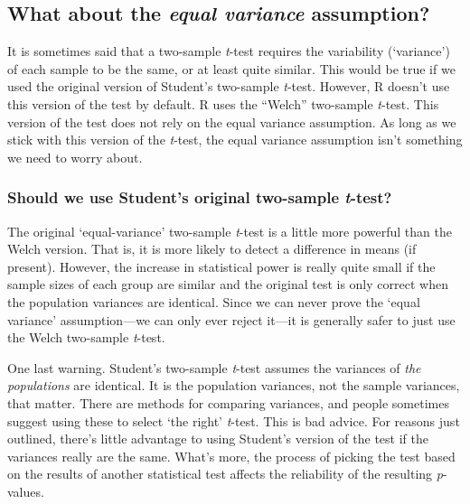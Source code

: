 \documentclass[
]{book}
\newenvironment{greybox}{
  \definecolor{shadecolor}{rgb}{0.95,0.95,0.95}  %
  \color{black}
  \begin{shaded}}
 {\end{shaded}}
\newenvironment{infobox}[1]
  {
  \begin{itemize}
  \renewcommand{\labelitemi}{
    \raisebox{-.7\height}[0pt][0pt]{
      {\setkeys{Gin}{width=3em,keepaspectratio}
        \texttt{[image: images/\#1]}}
    }
  }
  \setlength{\fboxsep}{1em}
  \begin{greybox}
  \item
  }
  {
  \end{greybox}
  \end{itemize}
  }
\begin{document}
\hypertarget{what-about-the-equal-variance-assumption}{%
\subsection{\texorpdfstring{What about the \emph{equal variance} assumption?}{What about the equal variance assumption?}}\label{what-about-the-equal-variance-assumption}}

It is sometimes said that a two-sample \emph{t}-test requires the variability (`variance') of each sample to be the same, or at least quite similar. This would be true if we used the original version of Student's two-sample \emph{t}-test. However, R doesn't use this version of the test by default. R uses the ``Welch'' two-sample \emph{t}-test. This version of the test does not rely on the equal variance assumption. As long as we stick with this version of the \emph{t}-test, the equal variance assumption isn't something we need to worry about.

\begin{infobox}{information}

\hypertarget{should-we-use-students-original-two-sample-t-test}{%
\subsubsection*{\texorpdfstring{Should we use Student's original two-sample \emph{t}-test?}{Should we use Student's original two-sample t-test?}}\label{should-we-use-students-original-two-sample-t-test}}

The original `equal-variance' two-sample \emph{t}-test is a little more powerful than the Welch version. That is, it is more likely to detect a difference in means (if present). However, the increase in statistical power is really quite small if the sample sizes of each group are similar and the original test is only correct when the population variances are identical. Since we can never prove the `equal variance' assumption---we can only ever reject it---it is generally safer to just use the Welch two-sample \emph{t}-test.

One last warning. Student's two-sample \emph{t}-test assumes the variances of \emph{the populations} are identical. It is the population variances, not the sample variances, that matter. There are methods for comparing variances, and people sometimes suggest using these to select `the right' \emph{t}-test. This is bad advice. For reasons just outlined, there's little advantage to using Student's version of the test if the variances really are the same. What's more, the process of picking the test based on the results of another statistical test affects the reliability of the resulting \emph{p}-values.

\end{infobox}
\end{document}
